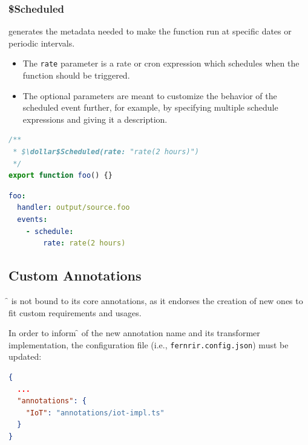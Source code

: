 \subsubsection{\$Scheduled}
generates the metadata needed to make the function run at specific dates or periodic intervals.
\begin{itemize}
  \item The \verb|rate| parameter is a rate or cron expression
    which schedules when the function should be triggered.
  \item The optional parameters are meant to customize the behavior of the scheduled event further,
     for example, by specifying multiple schedule expressions and giving it a description.
\end{itemize}
\begin{multicols}{2}[\columnsep=2cm]
\begin{lstlisting}[language=javascript]
/**
 * $\dollar$Scheduled(rate: "rate(2 hours)")
 */
export function foo() {}
\end{lstlisting}
\columnbreak

\begin{lstlisting}[language=yaml]
foo:
  handler: output/source.foo
  events:
    - schedule:
        rate: rate(2 hours)
\end{lstlisting}
\end{multicols}

\subsection{Custom Annotations}

\f{} is not bound to its core annotations, as it endorses the creation of new ones
to fit custom requirements and usages.

In order to inform \f{} of the new annotation name and its transformer implementation,
the configuration file (i.e., \verb|fernrir.config.json|) must be updated:
\begin{lstlisting}[language=json]
{
  ...
  "annotations": {
    "IoT": "annotations/iot-impl.ts"
  }
}
\end{lstlisting}

